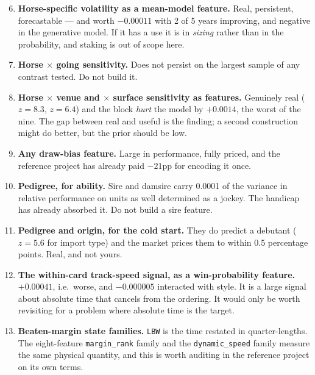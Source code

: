 \documentclass[11pt,a4paper]{article}
\begin{document}
\begin{enumerate}\setcounter{enumi}{5}\itemsep3pt
\item \textbf{Horse-specific volatility as a mean-model feature.} Real, persistent,
forecastable --- and worth $-0.00011$ with 2 of 5 years improving, and negative in
the generative model. If it has a use it is in \emph{sizing} rather than in the
probability, and staking is out of scope here.

\item \textbf{Horse $\times$ going sensitivity.} Does not persist on the largest
sample of any contrast tested. Do not build it.

\item \textbf{Horse $\times$ venue and $\times$ surface sensitivity as features.}
Genuinely real ($z=8.3$, $z=6.4$) and the block \emph{hurt} the model by $+0.0014$,
the worst of the nine. The gap between real and useful is the finding; a second
construction might do better, but the prior should be low.

\item \textbf{Any draw-bias feature.} Large in performance, fully priced,
and the reference project has already paid $-21$pp for encoding it once.

\item \textbf{Pedigree, for ability.} Sire and damsire carry 0.0001 of the
variance in relative performance on units as well determined as a jockey. The
handicap has already absorbed it. Do not build a sire feature.

\item \textbf{Pedigree and origin, for the cold start.} They do predict a
debutant ($z=5.6$ for import type) and the market prices them to within
0.5 percentage points. Real, and not yours.

\item \textbf{The within-card track-speed signal, as a win-probability feature.}
$+0.00041$, i.e.\ worse, and $-0.000005$ interacted with style. It is a large
signal about absolute time that cancels from the ordering. It would only be worth
revisiting for a problem where absolute time is the target.

\item \textbf{Beaten-margin state families.} \texttt{LBW} is the time restated in
quarter-lengths. The eight-feature \texttt{margin\_rank} family and the
\texttt{dynamic\_speed} family measure the same physical quantity, and this is
worth auditing in the reference project on its own terms.
\end{enumerate}
\end{document}
